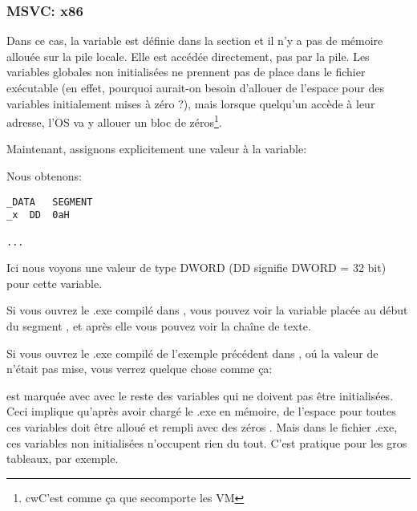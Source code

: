 \subsubsection{MSVC: x86}



Dans ce cas, la variable  est définie dans la section  et il n'y
a pas de mémoire allouée sur la pile locale. Elle est accédée directement, pas par
la pile.
Les variables globales non initialisées ne prennent pas de place dans le fichier
exécutable (en effet, pourquoi aurait-on besoin d'allouer de l'espace pour des variables
initialement mises à zéro ?), mais lorsque quelqu'un accède à leur adresse, l'\ac{OS}
va y allouer un bloc de zéros\footnote{cwC'est comme ça que secomporte les \ac{VM}}.

Maintenant, assignons explicitement une valeur à la variable:



Nous obtenons:

\begin{lstlisting}[style=customasmx86]
_DATA	SEGMENT
_x	DD	0aH

...
\end{lstlisting}

Ici nous voyons une valeur  de type DWORD (DD signifie DWORD = 32 bit) pour
cette variable.

Si vous ouvrez le .exe compilé dans \IDA, vous pouvez voir la variable  placée
au début du segment , et après elle vous pouvez voir la chaîne de texte.

Si vous ouvrez le .exe compilé de l'exemple précédent dans \IDA, oú la valeur de
 n'était pas mise, vous verrez quelque chose comme ça:



 est marquée avec  avec le reste des variables qui ne doivent pas être
initialisées.
Ceci implique qu'après avoir chargé le .exe en mémoire, de l'espace pour toutes ces
variables doit être alloué et rempli avec des zéros .
Mais dans le fichier .exe, ces variables non initialisées n'occupent rien du tout.
C'est pratique pour les gros tableaux, par exemple.



